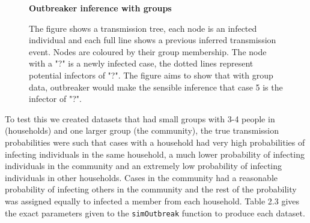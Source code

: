 \documentclass[11pt,a4paper]{report}
\begin{document}
\begin{figure}[h!]
\centering
{}\newline
{\bf Outbreaker inference with groups}
\caption{The figure shows a transmission tree, each node is an infected individual and each full line shows a previous inferred transmission event. Nodes are coloured by their group membership. The node with a "?" is a newly infected case, the dotted lines represent potential infectors of "?". The figure aims to show that with group data, outbreaker would make the sensible inference that case 5 is the infector of "?".}
\end{figure}
To test this we created datasets that had small groups with 3-4 people in (households) and one larger group (the community), the true transmission probabilities were such that cases with a household had very high probabilities of infecting individuals in the same household, a much lower probability of infecting individuals in the community and an extremely low probability of infecting individuals in other households. Cases in the community had a reasonable probability of infecting others in the community and the rest of the probability was assigned equally to infected a member from each household. Table 2.3 gives the exact parameters given to the {\tt simOutbreak} function to produce each dataset.
\end{document}
